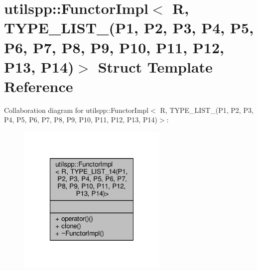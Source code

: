 \hypertarget{structutilspp_1_1FunctorImpl_3_01R_00_01TYPE__LIST__14_07P1_00_01P2_00_01P3_00_01P4_00_01P5_00_068b9945896861b079e861dc8bbcfbe94}{\section{utilspp\-:\-:Functor\-Impl$<$ R, T\-Y\-P\-E\-\_\-\-L\-I\-S\-T\-\_(P1, P2, P3, P4, P5, P6, P7, P8, P9, P10, P11, P12, P13, P14)$>$ Struct Template Reference}
\label{structutilspp_1_1FunctorImpl_3_01R_00_01TYPE__LIST__14_07P1_00_01P2_00_01P3_00_01P4_00_01P5_00_068b9945896861b079e861dc8bbcfbe94}
}


Collaboration diagram for utilspp\-:\-:Functor\-Impl$<$ R, T\-Y\-P\-E\-\_\-\-L\-I\-S\-T\-\_(P1, P2, P3, P4, P5, P6, P7, P8, P9, P10, P11, P12, P13, P14)$>$\-:
\nopagebreak
\begin{figure}[H]
\begin{center}
\leavevmode
\includegraphics[width=204pt]{structutilspp_1_1FunctorImpl_3_01R_00_01TYPE__LIST__14_07P1_00_01P2_00_01P3_00_01P4_00_01P5_00_0b0404484014de1058783e20f736fdade}
\end{center}
\end{figure}
